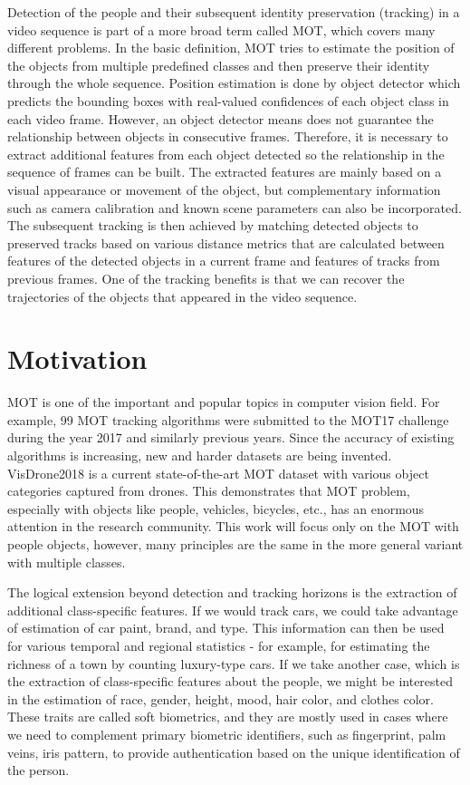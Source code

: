 \begin{introduction}
Detection of the people and their subsequent identity preservation (tracking) in a video sequence is part of a more broad term called \gls{MOT}, which covers many different problems. In the basic definition, \gls{MOT} tries to estimate the position of the objects from multiple predefined classes and then preserve their identity through the whole sequence. Position estimation is done by object detector which predicts the bounding boxes with real-valued confidences of each object class in each video frame. However, an object detector means does not guarantee the relationship between objects in consecutive frames. Therefore, it is necessary to extract additional features from each object detected so the relationship in the sequence of frames can be built. The extracted features are mainly based on a visual appearance or movement of the object, but complementary information such as camera calibration and known scene parameters can also be incorporated. The subsequent tracking is then achieved by matching detected objects to preserved tracks based on various distance metrics that are calculated between features of the detected objects in a current frame and features of tracks from previous frames. One of the tracking benefits is that we can recover the trajectories of the objects that appeared in the video sequence. 

\section{Motivation}
    \gls{MOT} is one of the important and popular topics in computer vision field. For example, 99 \gls{MOT} tracking algorithms were submitted to the MOT17 challenge \cite{MOT16} during the year 2017 and similarly previous years. Since the accuracy of existing algorithms is increasing, new and harder datasets are being invented. VisDrone2018 \cite{zhuvisdrone2018} is a current state-of-the-art \gls{MOT} dataset with various object categories captured from drones. This demonstrates that \gls{MOT} problem, especially with objects like people, vehicles, bicycles, etc., has an enormous attention in the research community. This work will focus only on the MOT with people objects, however, many principles are the same in the more general variant with multiple classes.
    
    The logical extension beyond detection and tracking horizons is the extraction of additional class-specific features. If we would track cars, we could take advantage of estimation of car paint, brand, and type. This information can then be used for various temporal and regional statistics - for example, for estimating the richness of a town by counting luxury-type cars. If we take another case, which is the extraction of class-specific features about the people, we might be interested in the estimation of race, gender, height, mood, hair color, and clothes color. These traits are called soft biometrics, and they are mostly used in cases where we need to complement primary biometric identifiers, such as fingerprint, palm veins, iris pattern, to provide authentication based on the unique identification of the person.
    

\end{introduction}
